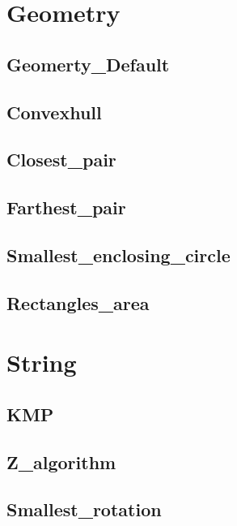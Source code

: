 \section{Geometry}
    \subsection{Geomerty\_Default}
        
    \subsection{Convexhull}
        
    \subsection{Closest\_pair}
        
    \subsection{Farthest\_pair}
        
    \subsection{Smallest\_enclosing\_circle}
        
    \subsection{Rectangles\_area}
        

\section{String}
    \subsection{KMP}
        
    \subsection{Z\_algorithm}
        
    \subsection{Smallest\_rotation}
        
